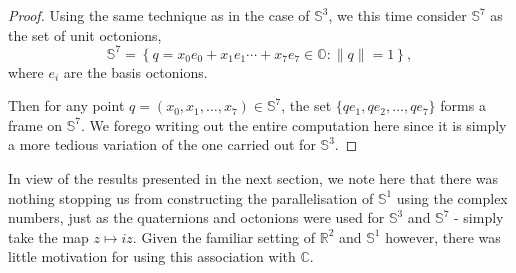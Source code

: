 \documentclass[12pt,a4paper]{article}
\begin{document}
\begin{proof}
Using the same technique as in the case of $\mathbb{S}^3$, we this time consider $\mathbb{S}^7$ as the set of unit octonions,
\[
\mathbb{S}^7=\left\{q=x_0e_0+x_1e_1\cdots+x_7e_7\in\mathbb{O}:\|q\|=1 \right\},
\]
where $e_i$ are the basis octonions.

Then for any point $q=(x_0,x_1,\ldots,x_7)\in\mathbb{S}^7$, the set $\{qe_1,qe_2,\ldots,qe_7\}$ forms a frame on $\mathbb{S}^7$.
We forego writing out the entire computation here since it is simply a more tedious variation of the one carried out for $\mathbb{S}^3$.

\end{proof}
\begin{remark}
In view of the results presented in the next section, we note here that there was nothing stopping us from constructing the parallelisation of $\mathbb{S}^1$ using the complex numbers, just as the quaternions and octonions were used for $\mathbb{S}^3$ and $\mathbb{S}^7$ - simply take the map $z\mapsto iz$. Given the familiar setting of $\mathbb{R}^2$ and $\mathbb{S}^1$ however, there was little motivation for using this association with $\mathbb{C}$.
\end{remark}

\pagebreak
\end{document}
